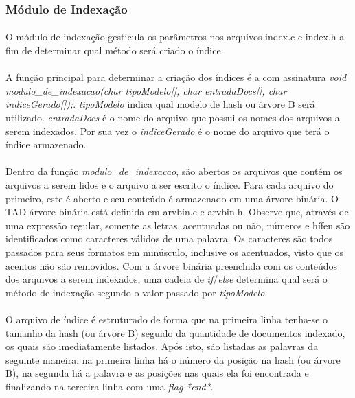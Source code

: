 \documentclass[12pt,a4paper]{article}
\begin{document}
   \subsubsection{Módulo de Indexação}
    {\paragraph{} O módulo de indexação gesticula os parâmetros nos arquivos index.c e index.h a fim de determinar qual método será criado o índice. }
    {\paragraph{} A função principal para determinar a criação dos índices é a com assinatura \emph{void modulo\_de\_indexacao(char tipoModelo[], char entradaDocs[], char indiceGerado[]);}. \emph{tipoModelo} indica qual modelo de hash ou árvore B será utilizado. \emph{entradaDocs} é o nome do arquivo que possui os nomes dos arquivos a serem indexados. Por sua vez o \emph{indiceGerado} é o nome do arquivo que terá o índice armazenado. }
    {\paragraph{} Dentro da função \emph{modulo\_de\_indexacao}, são abertos os arquivos que contém os arquivos a serem lidos e o arquivo a ser escrito o índice. Para cada arquivo do primeiro, este é aberto e seu conteúdo é armazenado em uma árvore binária. O TAD árvore binária está definida em arvbin.c e arvbin.h. Observe que, através de uma expressão regular, somente as letras, acentuadas ou não, números e hífen são identificados como caracteres válidos de uma palavra. Os caracteres são todos passados para seus formatos em minúsculo, inclusive os acentuados, visto que os acentos não são removidos. Com a árvore binária preenchida com os conteúdos dos arquivos a serem indexados, uma cadeia de \emph{if}/\emph{else} determina qual será o método de indexação segundo o valor passado por \emph{tipoModelo}. }
    {\paragraph{} O arquivo de índice é estruturado de forma que na primeira linha tenha-se o tamanho da hash (ou árvore B) seguido da quantidade de documentos indexado, os quais são imediatamente listados. Após isto, são listadas as palavras da seguinte maneira: na primeira linha há o número da posição na hash (ou árvore B), na segunda há a palavra e as posições nas quais ela foi encontrada e finalizando na terceira linha com uma \emph{flag} \emph{*end*}. }
   
\end{document}
